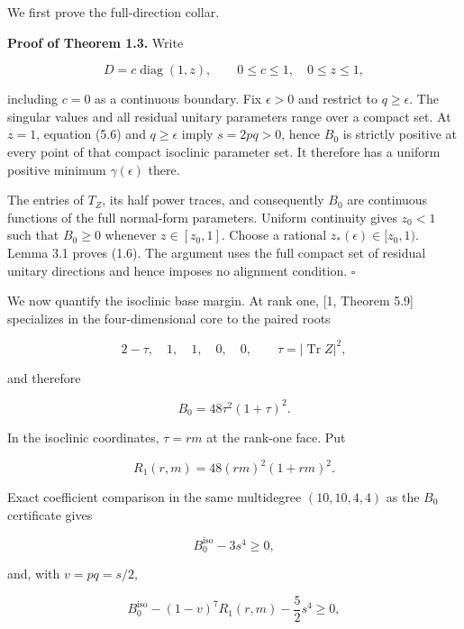 \documentclass[11pt]{article}
\begin{document}
We first prove the full-direction collar.

\textbf{Proof of Theorem 1.3.} Write

\begin{equation}
D=c\operatorname{diag}(1,z),\qquad 0\le c\le1,\quad0\le z\le1,
\tag{6.1}
\end{equation}

including $c=0$ as a continuous boundary. Fix $\epsilon>0$ and restrict to $q\ge\epsilon$. The singular values and all residual unitary parameters range over a compact set. At $z=1$, equation (5.6) and $q\ge\epsilon$ imply $s=2pq>0$, hence $B_0$ is strictly positive at every point of that compact isoclinic parameter set. It therefore has a uniform positive minimum $\gamma(\epsilon)$ there.

The entries of $T_Z$, its half power traces, and consequently $B_0$ are continuous functions of the full normal-form parameters. Uniform continuity gives $z_0<1$ such that $B_0\ge0$ whenever $z\in[z_0,1]$. Choose a rational $z_*(\epsilon)\in[z_0,1)$. Lemma 3.1 proves (1.6). The argument uses the full compact set of residual unitary directions and hence imposes no alignment condition. $\square$

We now quantify the isoclinic base margin. At rank one, [1, Theorem 5.9] specializes in the four-dimensional core to the paired roots

\[
2-\tau,\quad1,\quad1,\quad0,\quad0,
\qquad \tau=|\operatorname{Tr}Z|^2,
\]

and therefore

\begin{equation}
B_0=48\tau^2(1+\tau)^2.
\tag{6.2}
\end{equation}

In the isoclinic coordinates, $\tau=rm$ at the rank-one face. Put

\begin{equation}
R_1(r,m)=48(rm)^2(1+rm)^2.
\tag{6.3}
\end{equation}

Exact coefficient comparison in the same multidegree $(10,10,4,4)$ as the $B_0$ certificate gives

\begin{equation}
B_0^{\mathrm{iso}}-3s^4\ge0,
\tag{6.4}
\end{equation}

and, with $v=pq=s/2$,

\begin{equation}
B_0^{\mathrm{iso}}-(1-v)^7R_1(r,m)-\frac52s^4\ge0,
\tag{6.5}
\end{equation}
\end{document}
